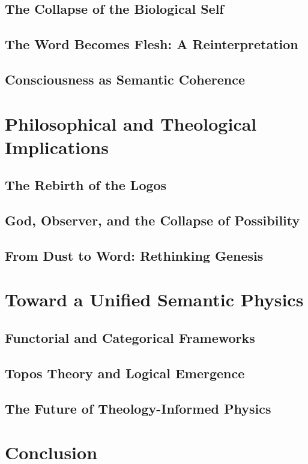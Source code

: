 \documentclass[12pt]{article}
\begin{document}
\subsection{The Collapse of the Biological Self}
\subsection{The Word Becomes Flesh: A Reinterpretation}
\subsection{Consciousness as Semantic Coherence}

\section{Philosophical and Theological Implications}
\subsection{The Rebirth of the Logos}
\subsection{God, Observer, and the Collapse of Possibility}
\subsection{From Dust to Word: Rethinking Genesis}

\section{Toward a Unified Semantic Physics}
\subsection{Functorial and Categorical Frameworks}
\subsection{Topos Theory and Logical Emergence}
\subsection{The Future of Theology-Informed Physics}

\section{Conclusion}
\end{document}
